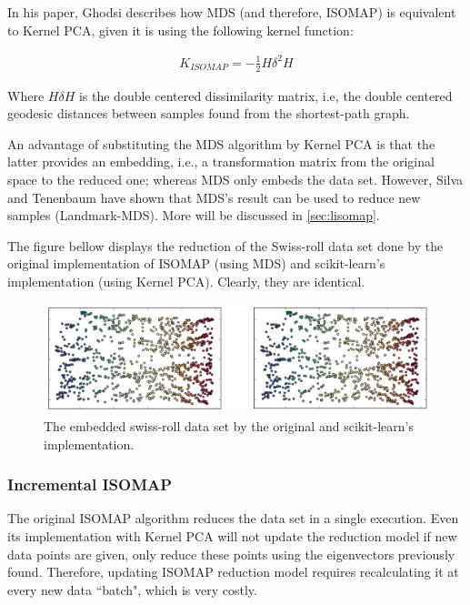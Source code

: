 \documentclass[12pt]{report}
\begin{document}
In his paper, Ghodsi describes how MDS (and therefore, ISOMAP) is equivalent to Kernel PCA, given it is using the following kernel function: \cite{gho2006}

\begin{align*}
K_{ISOMAP} = -\frac{1}{2}H \delta^2 H
\end{align*}

Where $H \delta H$ is the double centered dissimilarity matrix, i.e, the double centered geodesic distances between samples found from the shortest-path graph.

An advantage of substituting the MDS algorithm by Kernel PCA is that the latter provides an embedding, i.e., a transformation matrix from the original space to the reduced one; whereas MDS only embeds the data set. \cite{ham2004kernel} However, Silva and Tenenbaum have shown that MDS's result can be used to reduce new samples (Landmark-MDS). \cite{silva2002global} More will be discussed in \ref{sec:lisomap}.

The figure bellow displays the reduction of the Swiss-roll data set done by the original implementation of ISOMAP (using MDS) and scikit-learn's implementation (using Kernel PCA). Clearly, they are identical.

\begin{figure}[H]
	\centering
	\includegraphics[width=\linewidth]{experiments/iso_comp_my_and_sklearn}
	\captionsetup{justification=centering}
	\caption{The embedded swiss-roll data set by the original and scikit-learn's implementation.}
\end{figure}

\subsubsection{Incremental ISOMAP}

The original ISOMAP algorithm reduces the data set in a single execution. Even its implementation with Kernel PCA will not update the reduction model if new data points are given, only reduce these points using the eigenvectors previously found. Therefore, updating ISOMAP reduction model requires recalculating it at every new data ``batch", which is very costly.
\end{document}
